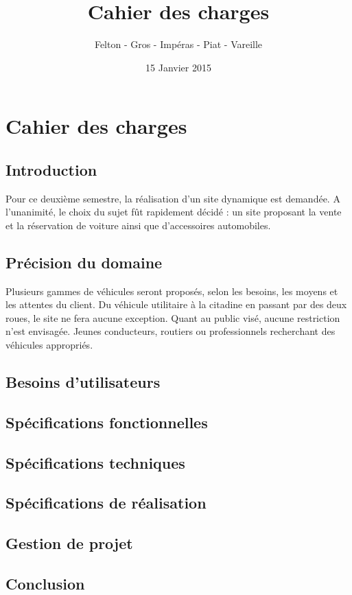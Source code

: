 \documentclass[a4paper]{article}
\title{\Huge \textbf{Cahier des charges}}
\author{\Large Felton - Gros - Impéras - Piat - Vareille}
\date{15 Janvier 2015}
\begin{document}
\maketitle
\newpage

\tableofcontents
\newpage

\section{Cahier des charges}
	\subsection{Introduction}
	
	Pour ce deuxième semestre, la réalisation d'un site dynamique est demandée. A l'unanimité, le choix du sujet fût rapidement décidé : un site proposant la vente et la réservation de voiture ainsi que d'accessoires automobiles.
	\subsection{Précision du domaine}
	
	Plusieurs gammes de véhicules seront proposés, selon les besoins, les moyens et les attentes du client. Du véhicule utilitaire à la citadine en passant par des deux roues, le site ne fera aucune exception. Quant au public visé, aucune restriction n'est envisagée. Jeunes conducteurs, routiers ou professionnels recherchant des véhicules appropriés.
	\subsection{Besoins d'utilisateurs}
	\subsection{Spécifications fonctionnelles}
	\subsection{Spécifications techniques}
	\subsection{Spécifications de réalisation}
	\subsection{Gestion de projet}
	\subsection*{Conclusion}
\end{document}
